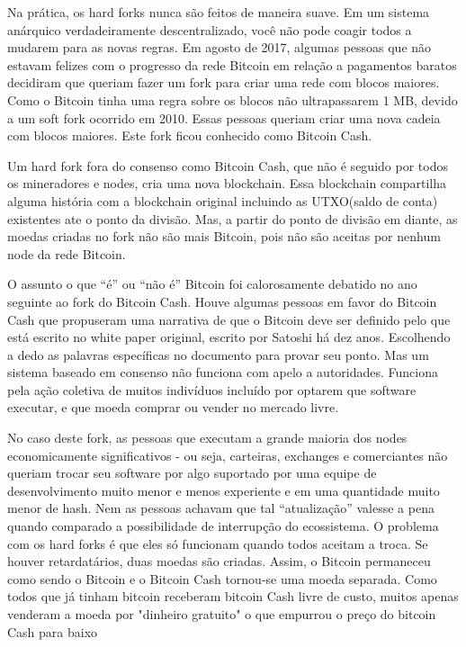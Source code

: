 Na prática, os hard forks nunca são feitos de maneira suave.
Em um sistema anárquico verdadeiramente descentralizado, você não pode coagir todos a mudarem para as novas regras.
Em agosto de 2017, algumas pessoas que não estavam felizes com o progresso da rede Bitcoin em relação a pagamentos baratos decidiram que queriam fazer um fork para criar uma rede com blocos maiores. 
Como o Bitcoin tinha uma regra sobre os blocos não ultrapassarem 1 MB, devido a um soft fork ocorrido em 2010. 
Essas pessoas queriam criar uma nova cadeia com blocos maiores.
Este fork ficou conhecido como Bitcoin Cash.

Um hard fork fora do consenso como Bitcoin Cash, que não é seguido por todos os mineradores e nodes, cria uma nova blockchain.
Essa blockchain compartilha alguma história com a blockchain original incluindo as UTXO(saldo de conta) existentes ate o ponto da divisão. 
Mas, a partir do ponto de divisão em diante, as moedas criadas no fork não são mais Bitcoin, pois não são aceitas por nenhum node da rede Bitcoin.

O assunto o que “é” ou “não é” Bitcoin foi calorosamente debatido no ano seguinte ao fork do Bitcoin Cash.
Houve algumas pessoas em favor do Bitcoin Cash que propuseram uma narrativa de que o Bitcoin deve ser definido pelo que está escrito no white paper original, escrito por Satoshi há dez anos. 
Escolhendo a dedo as palavras específicas no documento para provar seu ponto. 
Mas um sistema baseado em consenso não funciona com apelo a autoridades. 
Funciona pela ação coletiva de muitos indivíduos incluído por optarem que software executar, e que moeda comprar ou vender no mercado livre.

No caso deste fork, as pessoas que executam a grande maioria dos nodes economicamente significativos - ou seja, carteiras, exchanges e comerciantes não queriam trocar seu software por algo suportado por uma equipe de desenvolvimento muito menor e menos experiente e em uma quantidade muito menor de hash. %
Nem as pessoas achavam que tal “atualização” valesse a pena quando comparado a possibilidade de interrupção do ecossistema. 
O problema com os hard forks é que eles só funcionam quando todos aceitam a troca.
Se houver retardatários, duas moedas são criadas. 
Assim, o Bitcoin permaneceu como sendo o Bitcoin e o Bitcoin Cash tornou-se uma moeda separada.
Como todos que já tinham bitcoin receberam bitcoin Cash livre de custo, muitos apenas venderam a moeda por "dinheiro gratuito" o que empurrou o preço do bitcoin Cash para baixo

